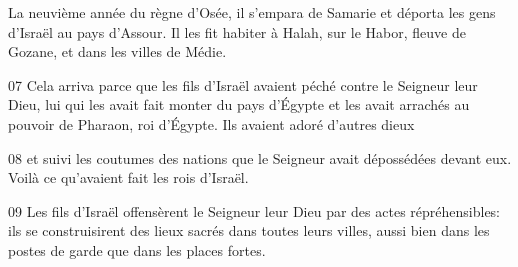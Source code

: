 La neuvième année du règne d’Osée, il s’empara de Samarie et déporta les gens d’Israël au pays d’Assour. Il les fit habiter à Halah, sur le Habor, fleuve de Gozane, et dans les villes de Médie.

07 Cela arriva parce que les fils d’Israël avaient péché contre le Seigneur leur Dieu, lui qui les avait fait monter du pays d’Égypte et les avait arrachés au pouvoir de Pharaon, roi d’Égypte. Ils avaient adoré d’autres dieux

08 et suivi les coutumes des nations que le Seigneur avait dépossédées devant eux. Voilà ce qu’avaient fait les rois d’Israël.

09 Les fils d’Israël offensèrent le Seigneur leur Dieu par des actes répréhensibles: ils se construisirent des lieux sacrés dans toutes leurs villes, aussi bien dans les postes de garde que dans les places fortes.